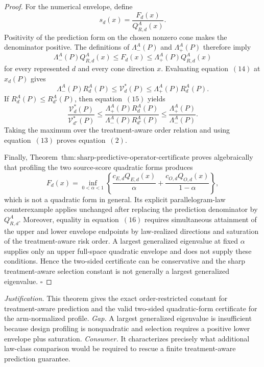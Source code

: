 \documentclass{article}
\begin{document}
\begin{proof}
For the numerical envelope, define
\[
 s_d(x)=\frac{F_d(x)}{Q_{R,d}^A(x)}.
\]
Positivity of the prediction form on the chosen nonzero cone makes the denominator positive.  The definitions of \(\Lambda_-^A(P)\) and \(\Lambda_+^A(P)\) therefore imply
\[
 \Lambda_-^A(P)Q_{R,d}^A(x)
 \le F_d(x)
 \le\Lambda_+^A(P)Q_{R,d}^A(x)                          \tag{14}
\]
for every represented \(d\) and every cone direction \(x\).  Evaluating equation~\((14)\) at \(x_d(P)\) gives
\[
 \Lambda_-^A(P)R_d^A(P)
 \le\mathcal V_d^*(P)
 \le\Lambda_+^A(P)R_d^A(P).                              \tag{15}
\]
If \(R_d^A(P)\le R_{d'}^A(P)\), then equation~\((15)\) yields
\[
 \frac{\mathcal V_d^*(P)}{\mathcal V_{d'}^*(P)}
 \le
 \frac{\Lambda_+^A(P)R_d^A(P)}
      {\Lambda_-^A(P)R_{d'}^A(P)}
 \le\frac{\Lambda_+^A(P)}{\Lambda_-^A(P)}.              \tag{16}
\]
Taking the maximum over the treatment-aware order relation and using equation~\((13)\) proves equation~\((2)\).

Finally, Theorem~\(\mathrm{thm{:}sharp\text{-}predictive\text{-}operator\text{-}certificate}\) proves algebraically that profiling the two source-score quadratic forms produces
\[
 F_d(x)=\inf_{0<\alpha<1}
 \left\{
 \frac{c_{E,d}Q_{E,d}(x)}\alpha+
 \frac{c_{O,d}Q_{O,d}(x)}{1-\alpha}
 \right\},                                                \tag{17}
\]
which is not a quadratic form in general.  Its explicit parallelogram-law counterexample applies unchanged after replacing the prediction denominator by \(Q_{R,d}^A\).  Moreover, equality in equation~\((16)\) requires simultaneous attainment of the upper and lower envelope endpoints by law-realized directions and saturation of the treatment-aware risk order.  A largest generalized eigenvalue at fixed \(\alpha\) supplies only an upper full-space quadratic envelope and does not supply these conditions.  Hence the two-sided certificate can be conservative and the sharp treatment-aware selection constant is not generally a largest generalized eigenvalue. \(\square\)
\end{proof}
\par\smallskip\noindent \textit{Justification.} This theorem gives the exact order-restricted constant for treatment-aware prediction and the valid two-sided quadratic-form certificate for the arm-normalized profile. \textit{Gap.} A largest generalized eigenvalue is insufficient because design profiling is nonquadratic and selection requires a positive lower envelope plus saturation. \textit{Consumer.} It characterizes precisely what additional law-class comparison would be required to rescue a finite treatment-aware prediction guarantee.
\end{document}

